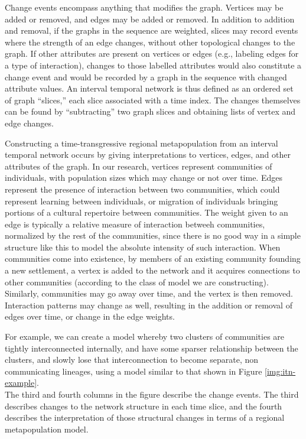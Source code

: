 \documentclass[graybox,natbib]{svmult}
\begin{document}
Change events encompass anything that modifies the graph. Vertices may
be added or removed, and edges may be added or removed. In addition to
addition and removal, if the graphs in the sequence are weighted, slices
may record events where the strength of an edge changes, without other
topological changes to the graph. If other attributes are present on
vertices or edges (e.g., labeling edges for a type of interaction),
changes to those labelled attributes would also constitute a change
event and would be recorded by a graph in the sequence with changed
attribute values. An interval temporal network is thus defined as an
ordered set of graph ``slices,'' each slice associated with a time
index. The changes themselves can be found by ``subtracting'' two graph
slices and obtaining lists of vertex and edge changes.

Constructing a time-transgressive regional metapopulation from an
interval temporal network occurs by giving interpretations to vertices,
edges, and other attributes of the graph. In our research, vertices
represent communities of individuals, with population sizes which may
change or not over time. Edges represent the presence of interaction
between two communities, which could represent learning between
individuals, or migration of individuals bringing portions of a cultural
repertoire between communities. The weight given to an edge is typically
a relative measure of interaction betweeh communities, normalized by the
rest of the communities, since there is no good way in a simple
structure like this to model the absolute intensity of such interaction.
When communities come into existence, by members of an existing
community founding a new settlement, a vertex is added to the network
and it acquires connections to other communities (according to the class
of model we are constructing). Similarly, communities may go away over
time, and the vertex is then removed. Interaction patterns may change as
well, resulting in the addition or removal of edges over time, or change
in the edge weights.

For example, we can create a model whereby two clusters of communities
are tightly interconnected internally, and have some sparser
relationship between the clusters, and slowly lose that interconnection
to become separate, non communicating lineages, using a model similar to
that shown in Figure \ref{img:itn-example}.\\
The third and fourth columns in the figure describe the change events.
The third describes changes to the network structure in each time slice,
and the fourth describes the interpretation of those structural changes
in terms of a regional metapopulation model.
\end{document}
